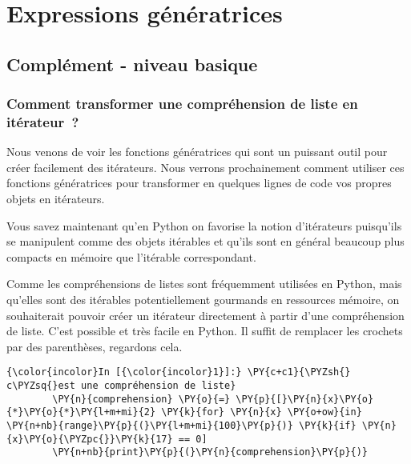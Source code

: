     
    
    
    

    

    \hypertarget{expressions-guxe9nuxe9ratrices}{%
\section{Expressions
génératrices}\label{expressions-guxe9nuxe9ratrices}}

    \hypertarget{compluxe9ment---niveau-basique}{%
\subsection{Complément - niveau
basique}\label{compluxe9ment---niveau-basique}}

    \hypertarget{comment-transformer-une-compruxe9hension-de-liste-en-ituxe9rateur}{%
\subsubsection{Comment transformer une compréhension de liste en
itérateur~?}\label{comment-transformer-une-compruxe9hension-de-liste-en-ituxe9rateur}}

    Nous venons de voir les fonctions génératrices qui sont un puissant
outil pour créer facilement des itérateurs. Nous verrons prochainement
comment utiliser ces fonctions génératrices pour transformer en quelques
lignes de code vos propres objets en itérateurs.

Vous savez maintenant qu'en Python on favorise la notion d'itérateurs
puisqu'ils se manipulent comme des objets itérables et qu'ils sont en
général beaucoup plus compacts en mémoire que l'itérable correspondant.

Comme les compréhensions de listes sont fréquemment utilisées en Python,
mais qu'elles sont des itérables potentiellement gourmands en ressources
mémoire, on souhaiterait pouvoir créer un itérateur directement à partir
d'une compréhension de liste. C'est possible et très facile en Python.
Il suffit de remplacer les crochets par des parenthèses, regardons cela.

    \begin{Verbatim}[commandchars=\\\{\},frame=single,framerule=0.3mm,rulecolor=\color{cellframecolor}]
{\color{incolor}In [{\color{incolor}1}]:} \PY{c+c1}{\PYZsh{} c\PYZsq{}est une compréhension de liste}
        \PY{n}{comprehension} \PY{o}{=} \PY{p}{[}\PY{n}{x}\PY{o}{*}\PY{o}{*}\PY{l+m+mi}{2} \PY{k}{for} \PY{n}{x} \PY{o+ow}{in} \PY{n+nb}{range}\PY{p}{(}\PY{l+m+mi}{100}\PY{p}{)} \PY{k}{if} \PY{n}{x}\PY{o}{\PYZpc{}}\PY{k}{17} == 0] 
        \PY{n+nb}{print}\PY{p}{(}\PY{n}{comprehension}\PY{p}{)}
\end{Verbatim}


